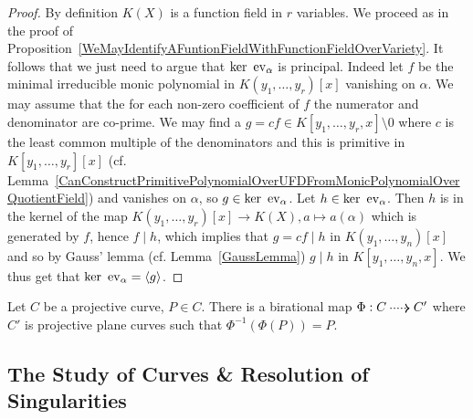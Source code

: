     \begin{proof}
        By definition $K(X)$ is a function field in $r$ variables. We proceed as in the proof of Proposition~\ref{WeMayIdentifyAFuntionFieldWithFunctionFieldOverVariety}. It follows that we just need to argue that $\ker \ \mathrm{ev}_\alpha$ is principal. Indeed let $f$ be the minimal irreducible monic polynomial in $K(y_1,\dots,y_r)[x]$ vanishing on $\alpha$. We may assume that the for each non-zero coefficient of $f$ the numerator and denominator are co-prime. We may find a $g=cf\in K[y_1,\dots,y_r,x]\setminus 0$ where $c$ is the least common multiple of the denominators and this is primitive in $K[y_1,\dots,y_r][x]$ (cf. Lemma~\ref{CanConstructPrimitivePolynomialOverUFDFromMonicPolynomialOverQuotientField}) and vanishes on $\alpha$, so $g\in \ker\ \mathrm{ev}_\alpha$. Let $h\in \ker\ \mathrm{ev}_\alpha$. Then $h$ is in the kernel of the map $K(y_1,\dots,y_r)[x]\rightarrow K(X), a\mapsto a(\alpha)$ which is generated by $f$, hence $f\mid h$, which implies that $g=cf \mid h$ in $K(y_1,\dots,y_n)[x]$ and so by Gauss' lemma (cf. Lemma~\ref{GaussLemma}) $g\mid h$ in  $K[y_1,\dots,y_n,x].$ We thus get that $\ker\ \mathrm{ev}_\alpha = \langle g\rangle$.
    \end{proof}
    \begin{proposition}
        Let $C$ be a projective curve, $P\in C$. There is a birational map $\Phi: C \dottedarrow C'$ where $C'$ is projective plane curves such that $\Phi^{-1}(\Phi(P))=P$. 
    \end{proposition}
\subsection{The Study of Curves \& Resolution of Singularities}
